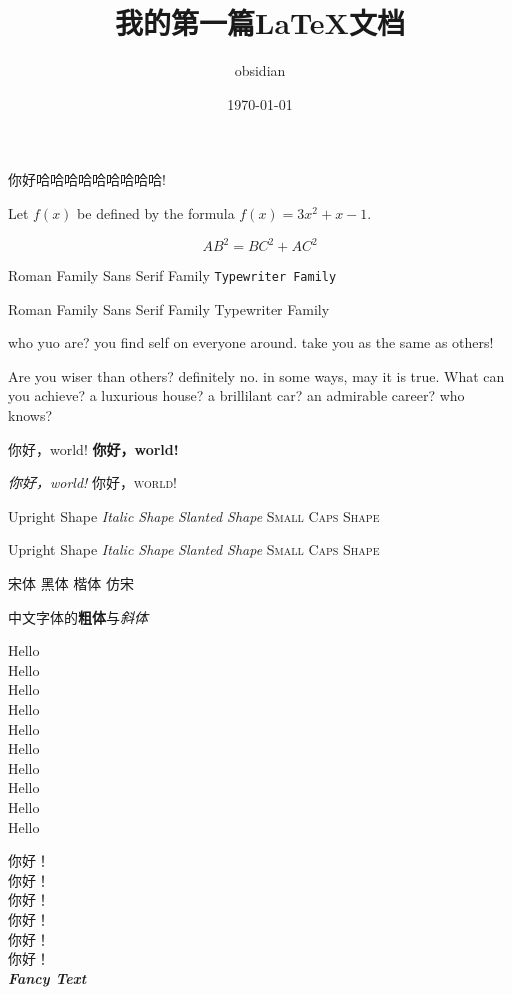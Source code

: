 \documentclass[UTF8]{ctexart}
\title{\heiti 我的第一篇\LaTeX{}文档}
\author{obsidian}
\date{\today}
\newcommand{\myfont}{\textit{\textbf{\textsf{Fancy Text}}}}
\begin{document}
\maketitle
你好哈哈哈哈哈哈哈哈哈!

Let $f(x)$ be defined by the formula $f(x)=3x^2+x-1$.

\begin{equation}
    AB^2=BC^2+AC^2 
\end{equation}

\textrm{Roman Family} \textsf{Sans Serif Family}
\texttt{Typewriter Family}

{\rmfamily Roman Family} {\sffamily Sans Serif Family}
{\ttfamily Typewriter Family}

{\sffamily who yuo are? you find self on everyone around. take you as the same as others!} 

{\ttfamily Are you wiser than others? definitely no. in some ways, may it is true. What can you achieve? a luxurious house? a brillilant car? an admirable career? who knows?}

\textmd{你好，world!} \textbf{你好，world!}

\textsl{你好，world!} \textsc{你好，world!}

\textup{Upright Shape} \textit{Italic Shape}
\textsl{Slanted Shape} \textsc{Small Caps Shape}

{\upshape Upright Shape} {\itshape Italic Shape} {\slshape Slanted Shape} {\scshape Small Caps Shape}

{\songti 宋体} {\heiti 黑体} {\kaishu 楷体} {\fangsong 仿宋}

中文字体的\textbf{粗体}与\textit{斜体}

{\tiny          Hello}\\
{\scriptsize    Hello}\\
{\footnotesize  Hello}\\
{\small         Hello}\\
{\normalsize    Hello}\\
{\large         Hello}\\
{\Large         Hello}\\
{\LARGE         Hello}\\
{\huge          Hello}\\
{\Huge          Hello}

 你好！\\
 你好！\\
 你好！\\
 你好！\\
 你好！\\
 你好！\\

\myfont
\end{document}
